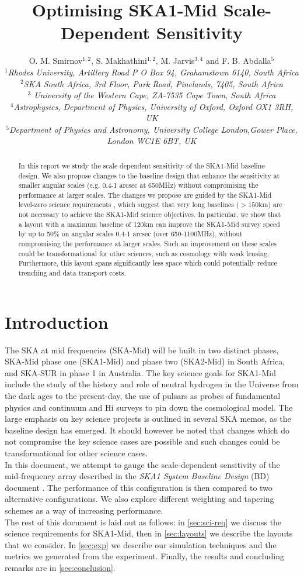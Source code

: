 \documentclass[sfheadings,a4paper,times,9pt,floats,floatfix]{article}
\title{Optimising SKA1-Mid Scale-Dependent Sensitivity}
\author{O. M. Smirnov$^{1,2}$, S. Makhathini$^{1,2}$, M. Jarvis$^{3,4}$ and F. B. Abdalla$^5$ \\{\footnotesize \it $^1$Rhodes
University, Artillery Road P O Box 94, Grahamstown 6140, South Africa} \\{ \footnotesize \it $^2$SKA South Africa, 3rd Floor,
Park Road, Pinelands, 7405, South Africa} \\{\footnotesize \it $^3$ University of the Western Cape, ZA-7535 Cape Town, South
Africa}\\ {\footnotesize \it $^4$Astrophysics, Department of Physics, University of Oxford, Oxford OX1 3RH, UK} \\ {\footnotesize \it $^5$Department of Physics
and Astronomy, University College London,Gower Place, London WC1E 6BT, UK}}
\begin{document}
\maketitle
\begin{abstract}
In this report we study the scale dependent sensitivity of the SKA1-Mid baseline design. We also propose changes to the baseline
design that enhance the sensitivity at smaller angular scales (e.g. 0.4-1 arcsec at 650MHz) without compromising the performance
at larger scales. The changes we propose are guided by the SKA1-Mid level-zero science requirements \cite{srd}, which suggest that
very long baselines ($>150$km) are not necessary to achieve the SKA1-Mid science objectives. In particular, we show that a layout
with a maximum baseline of 120km can improve the SKA1-Mid survey speed by up to 50\% on angular scales 0.4-1 arcsec (over
650-1100MHz), without compromising the performance at larger scales. Such an improvement on these scales could be transformational
for other sciences, such as cosmology with weak lensing. Furthermore, this layout spans significantly less space which could
potentially reduce trenching and data transport costs.
\end{abstract}
\section{Introduction}
The SKA at mid frequencies (SKA-Mid) will be built in two distinct phases, SKA-Mid phase one (SKA1-Mid) and phase two (SKA2-Mid)
in South Africa, and SKA-SUR in phase 1 in Australia. The key science goals for SKA1-Mid include the study of the history and role
of neutral hydrogen in the Universe from the dark ages to the present-day, the use of pulsars as probes of fundamental physics
\cite{bd} and continuum and H{\sc i} surveys to pin down the cosmological model. The large emphasis on key science
projects is outlined in several SKA memos, as the baseline design has emerged. It should however be noted that changes which do not
compromise the key science cases are possible and such changes could be transformational for other science 
cases. \\ In this document, we attempt to gauge the scale-dependent sensitivity of the mid-frequency array
described in the {\it SKA1 System Baseline Design} (BD) document \cite{bd}. The performance of this configuration is then compared
to two alternative configurations. We also explore different weighting and tapering schemes as a way of increasing performance.\\
The rest of this document is laid out as follows: in \autoref{sec:sci-req} we discuss the science requirements for SKA1-Mid, then
in \autoref{sec:layouts} we describe the layouts that we consider. In \autoref{sec:exp} we describe our simulation
techniques and the metrics we generated from the experiment. Finally, the results and concluding remarks are in
\autoref{sec:conclusion}.
\end{document}
